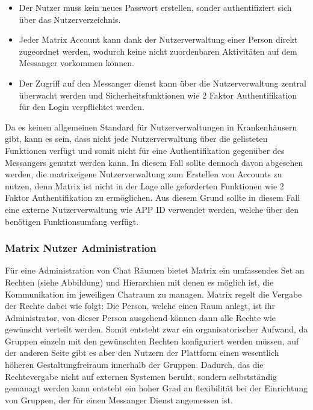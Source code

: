 \begin{itemize}
    \item Der Nutzer muss kein neues Passwort erstellen, sonder authentifiziert sich über das Nutzerverzeichnis.
    \item Jeder Matrix Account kann dank der Nutzerverwaltung einer Person direkt zugeordnet werden, wodurch keine nicht zuordenbaren Aktivitäten auf dem Messanger vorkommen können.  
    \item Der Zugriff auf den Messanger 
dienst kann über die Nutzerverwaltung zentral überwacht werden und Sicherheitsfunktionen wie 2 Faktor Authentifikation für den Login verpflichtet werden. 
\end{itemize}

Da es keinen allgemeinen Standard für Nutzerverwaltungen in Krankenhäusern gibt, kann es sein, dass nicht jede Nutzerverwaltung über die gelisteten Funktionen verfügt und somit nicht für eine Authentifikation gegenüber des Messangers genutzt werden kann. In diesem Fall sollte dennoch davon abgesehen werden, die matrixeigene Nutzerverwaltung zum Erstellen von Accounts zu nutzen, denn Matrix ist nicht in der Lage alle geforderten Funktionen wie 2 Faktor Authentifikation zu ermöglichen. Aus diesem Grund sollte in diesem Fall eine externe Nutzerverwaltung wie APP ID verwendet werden, welche über den benötigen Funktionsumfang verfügt.

\subsubsection{Matrix Nutzer Administration}\label{chapter:vdmf}
Für eine Administration von Chat Räumen bietet Matrix ein umfassendes Set an Rechten (siehe Abbildung) und Hierarchien mit denen es möglich ist, die Kommunikation im jeweiligen Chatraum zu managen. Matrix regelt die Vergabe der Rechte dabei wie folgt: Die Person, welche einen Raum anlegt, ist ihr Administrator, von dieser Person ausgehend können dann alle Rechte wie gewünscht verteilt werden. Somit entsteht zwar ein organisatorischer Aufwand, da Gruppen einzeln mit den gewünschten Rechten konfiguriert werden müssen, auf der anderen Seite gibt es aber den Nutzern der Plattform einen wesentlich höheren Gestaltungfreiraum innerhalb der Gruppen. Dadurch, das die Rechtevergabe nicht auf externen Systemen beruht, sondern selbstständig gemanagt werden kann entsteht ein hoher Grad an flexibilität bei der Einrichtung von Gruppen, der für einen Messanger Dienst angemessen ist.

